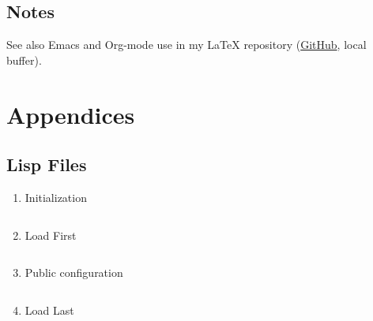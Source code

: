 \documentclass{article}
\begin{document}
\subsection{Notes}
\label{sec:orgf0b9c86}
See also Emacs and Org-mode use in my \LaTeX{} repository (\href{https://github.com/jeszyman/latex}{GitHub}, local buffer).\\[0pt]
\section{Appendices}
\label{sec:org0b721cb}
\subsection{Lisp Files}
\label{sec:orgab7a51c}
\begin{enumerate}
\item Initialization
\label{sec:org2d448dd}
\inputminted{emacs-lisp}{../emacs/init.el}
\item Load First
\label{sec:org5b97af1}
\inputminted{emacs-lisp}{../emacs/init.el}
\item Public configuration
\label{sec:org9113a15}
\inputminted{emacs-lisp}{../emacs/public_config.el}
\item Load Last
\label{sec:org7d8e5bf}
\inputminted{emacs-lisp}{../emacs/load-last.el}
\end{enumerate}
\end{document}
